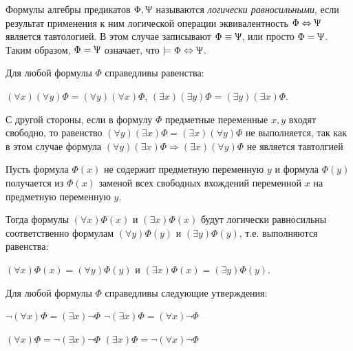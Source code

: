 \begin{definition}
    Формулы алгебры предикатов 
$\Phi,\Uppsi$ называются \textit{логически равносильными}, если 
результат применения к ним логической 
операции эквивалентность $\Phi\Leftrightarrow\Uppsi$ является 
тавтологией. 
В этом случае записывают $\Phi\equiv\Uppsi$, или просто 
$\Phi = \Uppsi$.
Таким образом, $\Phi = \Uppsi$ означает, что $\models\Phi\Leftrightarrow\Uppsi$.
\end{definition}

\begin{theorem}
    Для любой формулы $\Phi$ справедливы равенства:

    \quad $(\forall x)(\forall y)\Phi = (\forall y)(\forall x)\Phi$, \quad
    $(\exists x)(\exists y)\Phi = (\exists y)(\exists x)\Phi$.

    С другой стороны, если в формулу $\Phi$ предметные переменные $x,y$ входят свободно, то равенство $(\forall y)(\exists x)\Phi = (\exists x)(\forall y)\Phi$ не выполняется, так как в этом случае формула $(\forall y)(\exists x)\Phi \Rightarrow (\exists x)(\forall y)\Phi$ не является тавтолгией
\end{theorem}

\begin{theorem}[Теорема 2]
    Пусть формула $\Phi(x)$ не содержит предметную переменную $y$ и формула $\Phi(y)$ получается из $\Phi(x)$ заменой всех свободных вхождений переменной $x$ на предметную переменную $y$.

    Тогда формулы $(\forall x)\Phi(x)$ и $(\exists x)\Phi(x)$ будут логически равносильны соответственно формулам $(\forall y)\Phi(y)$ и $(\exists y)\Phi(y)$, т.е. выполняются равенства:

    $(\forall x)\Phi(x) = (\forall y)\Phi(y)$ и $(\exists x)\Phi(x)=(\exists y)\Phi(y)$.
\end{theorem}

\begin{theorem} 
    Для любой формулы $\Phi$ справедливы следующие утверждения:

    $\lnot(\forall x)\Phi=(\exists x)\lnot\Phi$ \qquad 
    $\lnot(\exists x)\Phi=(\forall x)\lnot \Phi$

    $(\forall x)\Phi =\lnot(\exists x)\lnot\Phi$ \qquad
    $(\exists x)\Phi = \lnot(\forall x)\lnot\Phi$
\end{theorem}

